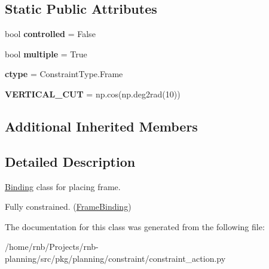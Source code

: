 \subsection*{Static Public Attributes}
\begin{DoxyCompactItemize}
\item 
\mbox{\label{classrnb-planning_1_1src_1_1pkg_1_1planning_1_1constraint_1_1constraint__action_1_1_place_frame_aff640b714e8d03af68bf1d1a40e56e12}} 
bool {\bfseries controlled} = False
\item 
\mbox{\label{classrnb-planning_1_1src_1_1pkg_1_1planning_1_1constraint_1_1constraint__action_1_1_place_frame_acfbfe54248a2af6f90a3c680a848804b}} 
bool {\bfseries multiple} = True
\item 
\mbox{\label{classrnb-planning_1_1src_1_1pkg_1_1planning_1_1constraint_1_1constraint__action_1_1_place_frame_a80c552f01cf371714add80f65d79be6a}} 
{\bfseries ctype} = Constraint\+Type.\+Frame
\item 
\mbox{\label{classrnb-planning_1_1src_1_1pkg_1_1planning_1_1constraint_1_1constraint__action_1_1_place_frame_ae4ca3b9c75f03c3dfceade4e32bbb183}} 
{\bfseries V\+E\+R\+T\+I\+C\+A\+L\+\_\+\+C\+UT} = np.\+cos(np.\+deg2rad(10))
\end{DoxyCompactItemize}
\subsection*{Additional Inherited Members}


\subsection{Detailed Description}
\hyperlink{classrnb-planning_1_1src_1_1pkg_1_1planning_1_1constraint_1_1constraint__action_1_1_binding}{Binding} class for placing frame. 

Fully constrained. (\hyperlink{classrnb-planning_1_1src_1_1pkg_1_1planning_1_1constraint_1_1constraint__action_1_1_frame_binding}{Frame\+Binding}) 

The documentation for this class was generated from the following file\+:\begin{DoxyCompactItemize}
\item 
/home/rnb/\+Projects/rnb-\/planning/src/pkg/planning/constraint/constraint\+\_\+action.\+py\end{DoxyCompactItemize}
